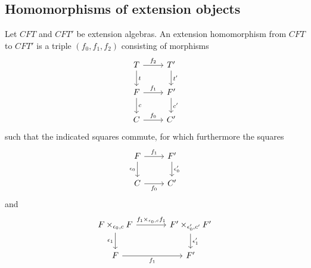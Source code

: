 \subsection{Homomorphisms of extension objects}
\begin{defn}
Let $CFT$ and $CFT'$ be extension algebras. An extension homomorphism from 
$CFT$ to $CFT'$ is a triple $(f_0,f_1,f_2)$ consisting of morphisms
\begin{equation*}
\begin{tikzcd}
T 
  \ar{r}{f_2}
  \ar{d}{t}
  &
T'
  \ar{d}{t'}
  \\
F 
  \ar{r}{f_1}
  \ar{d}{c}
  &
F'
  \ar{d}{c'}
  \\
C 
  \ar{r}{f_0}
  &
C'
\end{tikzcd}
\end{equation*}
such that the indicated squares commute, for which furthermore the squares
\begin{equation*}
\begin{tikzcd}
F \ar{r}{f_1}
  \ar{d}[swap]{\epsilon_0}
  &
F'
  \ar{d}{\epsilon_0'}
  \\
C \ar{r}[swap]{f_0}
  &
C'
\end{tikzcd}
\end{equation*}
and
\begin{equation*}
\begin{tikzcd}[column sep=large]
F\times_{\epsilon_0,c} F
  \ar{r}{f_1\times_{\epsilon_0,c} f_1}
  \ar{d}[swap]{\epsilon_1}
  &
F'\times_{\epsilon_0',c'} F'
  \ar{d}{\epsilon_1'}
  \\
F \ar{r}[swap]{f_1}
  &
F'
\end{tikzcd}
\end{equation*}
\end{defn}

